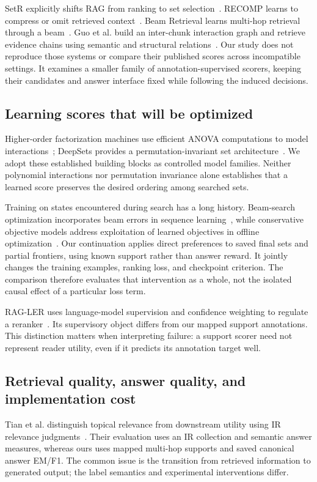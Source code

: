 \documentclass[preprint,12pt]{elsarticle}
\begin{document}
SetR explicitly shifts RAG from ranking to set selection~\cite{lee2025setr}. RECOMP learns to compress or omit retrieved context~\cite{xu2024recomp}. Beam Retrieval learns multi-hop retrieval through a beam~\cite{zhang2024beam}. Guo et al. build an inter-chunk interaction graph and retrieve evidence chains using semantic and structural relations~\cite{guo2025interchunk}. Our study does not reproduce those systems or compare their published scores across incompatible settings. It examines a smaller family of annotation-supervised scorers, keeping their candidates and answer interface fixed while following the induced decisions.

\subsection{Learning scores that will be optimized}
Higher-order factorization machines use efficient ANOVA computations to model interactions~\cite{blondel2016hofm}; DeepSets provides a permutation-invariant set architecture~\cite{zaheer2017deepsets}. We adopt these established building blocks as controlled model families. Neither polynomial interactions nor permutation invariance alone establishes that a learned score preserves the desired ordering among searched sets.

Training on states encountered during search has a long history. Beam-search optimization incorporates beam errors in sequence learning~\cite{wiseman2016bso}, while conservative objective models address exploitation of learned objectives in offline optimization~\cite{trabucco2021com}. Our continuation applies direct preferences to saved final sets and partial frontiers, using known support rather than answer reward. It jointly changes the training examples, ranking loss, and checkpoint criterion. The comparison therefore evaluates that intervention as a whole, not the isolated causal effect of a particular loss term.

RAG-LER uses language-model supervision and confidence weighting to regulate a reranker~\cite{zhai2025ragler}. Its supervisory object differs from our mapped support annotations. This distinction matters when interpreting failure: a support scorer need not represent reader utility, even if it predicts its annotation target well.

\subsection{Retrieval quality, answer quality, and implementation cost}
Tian et al. distinguish topical relevance from downstream utility using IR relevance judgments~\cite{tian2025relevance}. Their evaluation uses an IR collection and semantic answer measures, whereas ours uses mapped multi-hop supports and saved canonical answer EM/F1. The common issue is the transition from retrieved information to generated output; the label semantics and experimental interventions differ.
\end{document}
